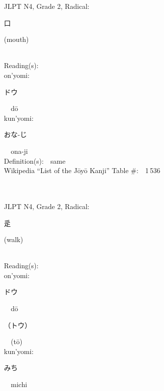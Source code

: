 \begin{multicols}{2}
{JLPT N4, Grade 2, Radical:\ \ {\begin{CJK}{UTF8}{min} 口 \end{CJK}} (mouth) } \\
Reading(s):\ \ \\
{\hspace*{1em}}on'yomi:\ \ \\
{\hspace*{2em}}{\begin{CJK}{UTF8}{min} ドウ \end{CJK}}\ \ d\=o\ \ \\
{\hspace*{1em}}kun'yomi:\ \ \\
{\hspace*{2em}}{\begin{CJK}{UTF8}{min} おな-じ \end{CJK}}\ \ ona-ji\ \ \\
Definition(s):\ \ same \\
Wikipedia ``List of the J\=oy\=o Kanji'' Table \#:\ \ 1\,536 \\
\ \ \\
{\fontsize{34pt}{40pt}  }\ \ \\  %
{JLPT N4, Grade 2, Radical:\ \ {\begin{CJK}{UTF8}{min} 辵 \end{CJK}} (walk) } \\
Reading(s):\ \ \\
{\hspace*{1em}}on'yomi:\ \ \\
{\hspace*{2em}}{\begin{CJK}{UTF8}{min} ドウ \end{CJK}}\ \ d\=o\ \ \\
{\hspace*{2em}}{\begin{CJK}{UTF8}{min} （トウ） \end{CJK}}\ \ (t\=o)\ \ \\
{\hspace*{1em}}kun'yomi:\ \ \\
{\hspace*{2em}}{\begin{CJK}{UTF8}{min} みち \end{CJK}}\ \ michi\ \ \\

\end{multicols}

